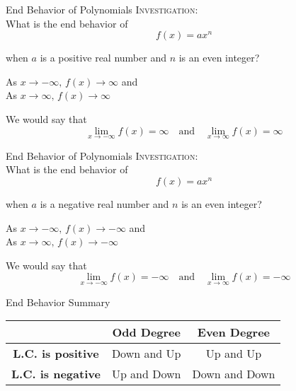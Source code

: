 \documentclass[t,usenames,dvipsnames]{beamer}
\begin{document}
\begin{frame}{End Behavior of Polynomials}
\textsc{Investigation:} \newline\\
What is the end behavior of
\[
f(x) = ax^n
\]

when $a$ is a positive real number and $n$ is an even integer?    \newline\\ \pause

As $x \to -\infty, \, f(x) \to \infty$ and \\
As $x \to \infty, \, f(x) \to \infty$   \newline\\ \pause

We would say that
\[
\lim_{x \to -\infty} f(x) = \infty \quad \text{and} \quad \lim_{x \to \infty} f(x) = \infty
\]
\end{frame}

\begin{frame}{End Behavior of Polynomials}
\textsc{Investigation:} \newline\\
What is the end behavior of
\[
f(x) = ax^n
\]

when $a$ is a negative real number and $n$ is an even integer?    \newline\\ \pause

As $x \to -\infty, \, f(x) \to -\infty$ and \\
As $x \to \infty, \, f(x) \to -\infty$   \newline\\ \pause

We would say that
\[
\lim_{x \to -\infty} f(x) = -\infty \quad \text{and} \quad \lim_{x \to \infty} f(x) = -\infty
\]
\end{frame}

\begin{frame}[c]{End Behavior Summary}
\begin{center}
\setlength{\extrarowheight}{6pt}
\begin{tabular}{c|c|c}
                        &   \textbf{Odd Degree}    &   \textbf{Even Degree} \\    \hline
    \textbf{L.C. is positive}    &   Down and Up   &   Up and Up     \\[3pt]  \hline
    \textbf{L.C. is negative}    &   Up and Down   &   Down and Down 
\end{tabular}
\end{center}
\end{frame}
\end{document}
